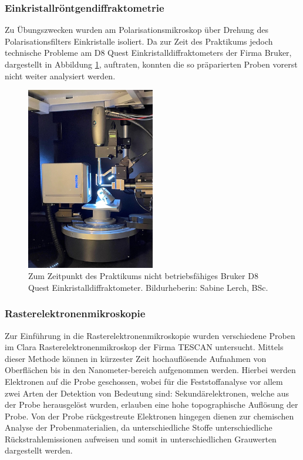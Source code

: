 \documentclass[12pt]{article}
\begin{document}
\subsubsection{Einkristallröntgendiffraktometrie}
Zu Übungszwecken wurden am Polarisationsmikroskop über Drehung des Polarisationsfilters Einkristalle isoliert.
Da zur Zeit des Praktikums jedoch technische Probleme am D8 Quest Einkristalldiffraktometers der Firma Bruker, dargestellt in Abbildung \ref{fig:brukeri}, auftraten, konnten die so präparierten Proben vorerst nicht weiter analysiert werden.

\begin{figure}[H]
    \centering
    \includegraphics[height=8cm]{Images/Einkristalldiff.jpg}
    \caption{Zum Zeitpunkt des Praktikums nicht betriebsfähiges Bruker D8 Quest Einkristalldiffraktometer. Bildurheberin: Sabine Lerch, BSc.}
    \label{fig:brukeri}
\end{figure}

\subsubsection{Rasterelektronenmikroskopie}
Zur Einführung in die Rasterelektronenmikroskopie wurden verschiedene Proben im Clara Rasterelektronenmikroskop der Firma TESCAN untersucht.
Mittels dieser Methode können in kürzester Zeit hochauflösende Aufnahmen von Oberflächen bis in den Nanometer-bereich aufgenommen werden.
Hierbei werden Elektronen auf die Probe geschossen, wobei für die Feststoffanalyse vor allem zwei Arten der Detektion von Bedeutung sind:
Sekundärelektronen, welche aus der Probe herausgelöst wurden, erlauben eine hohe topographische Auflösung der Probe. 
Von der Probe rückgestreute Elektronen hingegen dienen zur chemischen Analyse der Probenmaterialien, da unterschiedliche Stoffe unterschiedliche Rückstrahlemissionen aufweisen und somit in unterschiedlichen Grauwerten dargestellt werden.
\end{document}
